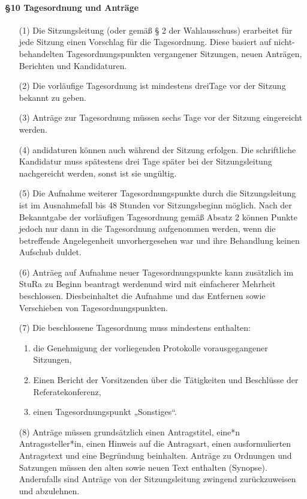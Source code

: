         \paragraph{§10 Tagesordnung und Anträge}
            \begin{itemize}
                \item[(1)] Die Sitzungsleitung (oder gemäß § 2 der Wahlausschuss) erarbeitet für jede Sitzung einen Vorschlag für die Tagesordnung. Diese basiert auf nicht-behandelten Tagesordnungspunkten vergangener Sitzungen, neuen Anträgen, Berichten und Kandidaturen.
                \item[(2)] Die vorläufige Tagesordnung ist mindestens dreiTage vor der Sitzung bekannt zu geben.
                \item[(3)] Anträge zur Tagesordnung müssen sechs Tage vor der Sitzung eingereicht werden. 
                \item[(4)] andidaturen können auch während der Sitzung erfolgen. Die schriftliche Kandidatur muss spätestens drei Tage später bei der Sitzungsleitung nachgereicht werden, sonst ist sie ungültig.
                \item[(5)] Die Aufnahme weiterer Tagesordnungspunkte durch die Sitzungsleitung ist im Ausnahmefall bis 48 Stunden vor Sitzungsbeginn möglich. Nach der Bekanntgabe der vorläufigen Tagesordnung gemäß Absatz 2 können Punkte jedoch nur dann in die Tagesordnung aufgenommen werden, wenn die betreffende Angelegenheit unvorhergesehen war und ihre Behandlung keinen Aufschub duldet.
                \item[(6)] Anträeg auf Aufnahme neuer Tagesordnungspunkte kann zusätzlich im StuRa zu Beginn beantragt werdenund wird mit einfacherer Mehrheit beschlossen. Diesbeinhaltet die Aufnahme und das Entfernen sowie Verschieben von Tagesordnungspunkten.
                \item[(7)] Die beschlossene Tagesordnung muss mindestens enthalten:
                    \begin{enumerate}
                        \item die Genehmigung der vorliegenden Protokolle vorausgegangener Sitzungen,
                        \item Einen Bericht der Vorsitzenden über die Tätigkeiten und Beschlüsse der Referatekonferenz,
                        \item einen Tagesordnungspunkt „Sonstiges“.
                    \end{enumerate}
                \item[(8)] Anträge müssen grundsätzlich einen Antragstitel, eine*n Antragssteller*in, einen Hinweis auf die Antragsart, einen ausformulierten Antragstext und eine Begründung beinhalten. Anträge zu Ordnungen und Satzungen müssen den alten sowie neuen Text enthalten (Synopse). Andernfalls sind Anträge von der Sitzungsleitung zwingend zurückzuweisen und abzulehnen.

\end{itemize}

